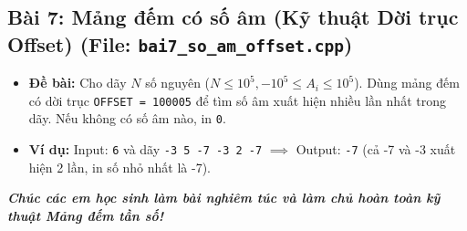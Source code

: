 \documentclass[11pt,a4paper]{article}
\begin{document}
\subsection*{\color{AsianDarkBlue}\normalsize Bài 7: Mảng đếm có số âm (Kỹ thuật Dời trục Offset) (File: \texttt{bai7\_so\_am\_offset.cpp})}
\begin{itemize}
    \setlength{\itemsep}{1pt}
    \small
    \item \textbf{Đề bài:} Cho dãy $N$ số nguyên ($N \le 10^5, -10^5 \le A_i \le 10^5$). Dùng mảng đếm có dời trục \texttt{OFFSET = 100005} để tìm số âm xuất hiện nhiều lần nhất trong dãy. Nếu không có số âm nào, in \texttt{0}.
    \item \textbf{Ví dụ:} Input: \texttt{6} và dãy \texttt{-3 5 -7 -3 2 -7} $\implies$ Output: \texttt{-7} (cả -7 và -3 xuất hiện 2 lần, in số nhỏ nhất là -7).
\end{itemize}

\vspace{0.4cm}
\begin{center}
    \textit{\color{AsianDarkBlue}\textbf{Chúc các em học sinh làm bài nghiêm túc và làm chủ hoàn toàn kỹ thuật Mảng đếm tần số!}}
\end{center}
\end{document}
